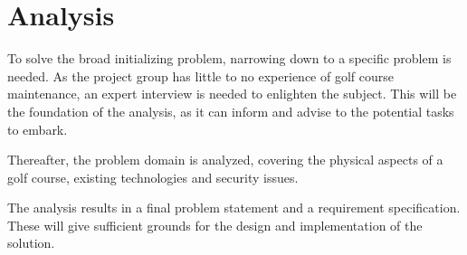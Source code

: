 
\chapter{Analysis}
To solve the broad initializing problem, narrowing down to a specific problem is needed. As the project group has little to no experience of golf course maintenance, an expert interview is needed to enlighten the subject. This will be the foundation of the analysis, as it can inform and advise to the potential tasks to embark.

Thereafter, the problem domain is analyzed, covering the physical aspects of a golf course, existing technologies and security issues. 

The analysis results in a final problem statement and a requirement specification. These will give sufficient grounds for the design and implementation of the solution.


% 





